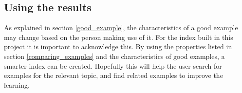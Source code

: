 \subsection{Using the results}

As explained in section \ref{good_example}, the characteristics of a good example may change based on the person making use of it. For the index built in this project it is important to acknowledge this. By using the properties listed in section \ref{comparing_examples} and the characteristics of good examples, a smarter index can be created. Hopefully this will help the user search for examples for the relevant topic, and find related examples to improve the learning.

\cleardoublepage